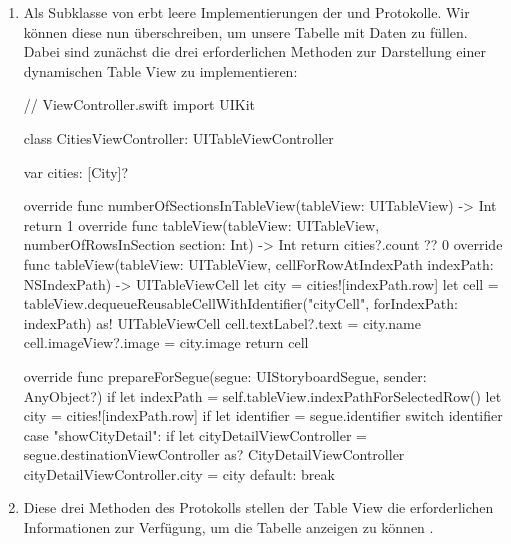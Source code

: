 \documentclass[parskip=half, final]{scrreprt}
\begin{document}
\begin{lecture}
\begin{enumerate}
\item Als Subklasse von  erbt  leere Implementierungen der  und  Protokolle. Wir können diese nun überschreiben, um unsere Tabelle mit Daten zu füllen. Dabei sind zunächst die drei erforderlichen Methoden zur Darstellung einer dynamischen Table View zu implementieren:

\begin{swiftcode}
// ViewController.swift
import UIKit

class CitiesViewController: UITableViewController {
    var cities: [City]?
    
    override func numberOfSectionsInTableView(tableView: UITableView) -> Int {
        return 1
    }
    override func tableView(tableView: UITableView, numberOfRowsInSection section: Int) -> Int {
        return cities?.count ?? 0
    }
    override func tableView(tableView: UITableView, cellForRowAtIndexPath indexPath: NSIndexPath) -> UITableViewCell {
        let city = cities![indexPath.row]
        let cell = tableView.dequeueReusableCellWithIdentifier("cityCell", forIndexPath: indexPath) as! UITableViewCell
        cell.textLabel?.text = city.name
        cell.imageView?.image = city.image
        return cell
    }
    
    override func prepareForSegue(segue: UIStoryboardSegue, sender: AnyObject?) {
        if let indexPath = self.tableView.indexPathForSelectedRow() {
            let city = cities![indexPath.row]
            if let identifier = segue.identifier {
                switch identifier {
                case "showCityDetail":
                    if let cityDetailViewController = segue.destinationViewController as? CityDetailViewController {
                        cityDetailViewController.city = city
                    }
                default:
                    break
                }
            }
        }
    }
}
\end{swiftcode}

\item Diese drei Methoden des  Protokolls stellen der Table View die erforderlichen Informationen zur Verfügung, um die Tabelle anzeigen zu können .



\end{enumerate}
\end{lecture}
\end{document}
